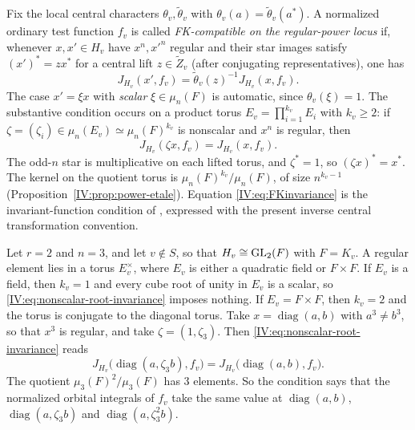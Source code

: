 \begin{definition}\label{IV:def:FKcompatible}
Fix the local central characters $\theta_v,\widetilde\theta_v$
with $\theta_v(a)=\widetilde\theta_v(a^*)$.  A normalized
ordinary test function $f_v$ is called \emph{FK-compatible on the
regular-power locus} if, whenever $x,x'\in H_v$ have $x^n,x'^n$
regular and their star images satisfy
$({x'})^*=z x^*$ for a central lift $z\in\widetilde Z_v$
(after conjugating representatives), one has
\begin{equation}\label{IV:eq:FKinvariance}
 J_{H_v}(x',f_v)
   =\widetilde\theta_v(z)^{-1}J_{H_v}(x,f_v).
\end{equation}
The case $x'=\xi x$ with \emph{scalar} $\xi\in\mu_n(F)$
is automatic, since $\theta_v(\xi)=1$.  The substantive
condition occurs on a product torus
$E_v=\prod_{i=1}^{k_v}E_i$ with $k_v\ge2$:
if $\zeta=(\zeta_i)\in\mu_n(E_v)\simeq\mu_n(F)^{k_v}$
is nonscalar and $x^n$ is regular, then
\begin{equation}\label{IV:eq:nonscalar-root-invariance}
 J_{H_v}(\zeta x,f_v)=J_{H_v}(x,f_v).
\end{equation}
The odd-$n$ star is multiplicative on each lifted torus, and
$\zeta^*=1$, so $(\zeta x)^*=x^*$.  The kernel on the
quotient torus is $\mu_n(F)^{k_v}/\mu_n(F)$, of size
$n^{k_v-1}$ (Proposition~\ref{IV:prop:power-etale}).
Equation \eqref{IV:eq:FKinvariance} is the invariant-function
condition of \cite[\S6]{FK86}, expressed with the present
inverse central transformation convention.
\end{definition}

\begin{example}\label{IV:ex:FKcompatible}
Let $r=2$ and $n=3$, and let $v\notin S$, so that $H_v\cong\operatorname{GL}_2(F)$ with $F=K_v$. A regular element lies in a torus $E_v^\times$, where $E_v$ is either a quadratic field or $F\times F$. If $E_v$ is a field, then $k_v=1$ and every cube root of unity in $E_v$ is a scalar, so \eqref{IV:eq:nonscalar-root-invariance} imposes nothing. If $E_v=F\times F$, then $k_v=2$ and the torus is conjugate to the diagonal torus. Take $x=\operatorname{diag}(a,b)$ with $a^3\neq b^3$, so that $x^3$ is regular, and take $\zeta=(1,\zeta_3)$. Then \eqref{IV:eq:nonscalar-root-invariance} reads
\[
 J_{H_v}\bigl(\operatorname{diag}(a,\zeta_3b),f_v\bigr)
 =J_{H_v}\bigl(\operatorname{diag}(a,b),f_v\bigr).
\]
The quotient $\mu_3(F)^2/\mu_3(F)$ has $3$ elements. So the condition says that the normalized orbital integrals of $f_v$ take the same value at $\operatorname{diag}(a,b)$, $\operatorname{diag}(a,\zeta_3b)$ and $\operatorname{diag}(a,\zeta_3^2b)$.
\end{example}


